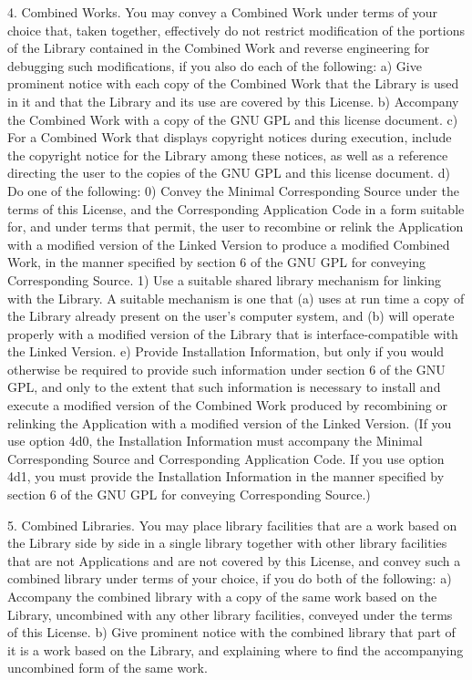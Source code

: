 \documentclass {book}
\begin{document}
\begin{tiny}
4. Combined Works. You may convey a Combined Work under terms of your choice that, taken together, effectively do not restrict modification of the portions of the Library contained in the Combined Work and reverse engineering for debugging such modifications, if you also do each of the following: a) Give prominent notice with each copy of the Combined Work that the Library is used in it and that the Library and its use are covered by this License. b) Accompany the Combined Work with a copy of the GNU GPL and this license document. c) For a Combined Work that displays copyright notices during execution, include the copyright notice for the Library among these notices, as well as a reference directing the user to the copies of the GNU GPL and this license document. d) Do one of the following: 0) Convey the Minimal Corresponding Source under the terms of this License, and the Corresponding Application Code in a form suitable for, and under terms that permit, the user to recombine or relink the Application with a modified version of the Linked Version to produce a modified Combined Work, in the manner specified by section 6 of the GNU GPL for conveying Corresponding Source. 1) Use a suitable shared library mechanism for linking with the Library. A suitable mechanism is one that (a) uses at run time a copy of the Library already present on the user's computer system, and (b) will operate properly with a modified version of the Library that is interface-compatible with the Linked Version. e) Provide Installation Information, but only if you would otherwise be required to provide such information under section 6 of the GNU GPL, and only to the extent that such information is necessary to install and execute a modified version of the Combined Work produced by recombining or relinking the Application with a modified version of the Linked Version. (If you use option 4d0, the Installation Information must accompany the Minimal Corresponding Source and Corresponding Application Code. If you use option 4d1, you must provide the Installation Information in the manner specified by section 6 of the GNU GPL for conveying Corresponding Source.)

5. Combined Libraries. You may place library facilities that are a work based on the Library side by side in a single library together with other library facilities that are not Applications and are not covered by this License, and convey such a combined library under terms of your choice, if you do both of the following: a) Accompany the combined library with a copy of the same work based on the Library, uncombined with any other library facilities, conveyed under the terms of this License. b) Give prominent notice with the combined library that part of it is a work based on the Library, and explaining where to find the accompanying uncombined form of the same work.


\end{tiny}
\end{document}
